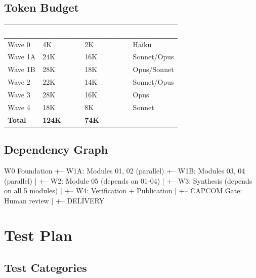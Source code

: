 \documentclass[11pt,letterpaper]{article}
\newcommand{\tableheader}[1]{\textbf{\sffamily\textcolor{white}{#1}}}
\begin{document}
\subsection{Token Budget}

\begin{center}
\begin{tabularx}{\textwidth}{L{3cm}C{2cm}C{2cm}C{2cm}}
\toprule
{}
\tableheader{Wave} & \tableheader{Tokens In} & \tableheader{Tokens Out} & \tableheader{Model} \\
\midrule
Wave 0 & 4K & 2K & Haiku \\
Wave 1A & 24K & 16K & Sonnet/Opus \\
Wave 1B & 28K & 18K & Opus/Sonnet \\
Wave 2 & 22K & 14K & Sonnet/Opus \\
Wave 3 & 28K & 16K & Opus \\
Wave 4 & 18K & 8K & Sonnet \\
\midrule
\textbf{Total} & \textbf{124K} & \textbf{74K} & \\
\bottomrule
\end{tabularx}
\end{center}

\subsection{Dependency Graph}

\begin{asciibox}
W0 Foundation
  +-- W1A: Modules 01, 02 (parallel)
  +-- W1B: Modules 03, 04 (parallel)
         |
         +-- W2: Module 05 (depends on 01-04)
                  |
                  +-- W3: Synthesis (depends on all 5 modules)
                           |
                           +-- W4: Verification + Publication
                                    |
                                    +-- CAPCOM Gate: Human review
                                             |
                                             +-- DELIVERY
\end{asciibox}

\section{Test Plan}

\subsection{Test Categories}
\end{document}
